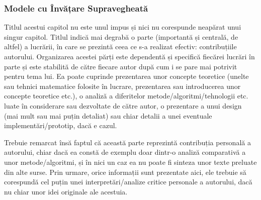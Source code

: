 \subsubsection{Modele cu Învățare Supravegheată}













Titlul acestui capitol nu este unul impus și nici nu corespunde neapărat unui singur capitol. Titlul indică mai degrabă o parte (importantă și centrală, de altfel) a lucrării, în care se prezintă ceea ce s-a realizat efectiv: contribuțiile autorului. Organizarea acestei părți este dependentă și specifică fiecărei lucrări în parte și este stabilită de către fiecare autor după cum i se pare mai potrivit pentru tema lui. Ea poate cuprinde prezentarea unor concepte teoretice (unelte sau tehnici matematice folosite în lucrare, prezentarea sau introducerea unor concepte teoretice etc.), o analiză a diferitelor metode/algoritmi/tehnologii etc. luate în considerare sau dezvoltate de către autor, o prezentare a unui design (mai mult sau mai puțin detaliat) sau chiar detalii a unei eventuale implementări/prototip, dacă e cazul.

Trebuie remarcat însă faptul că această parte reprezintă contribuția personală a autorului, chiar dacă ea constă de exemplu doar dintr-o analiză comparativă a unor metode/algoritmi, și în nici un caz ea nu poate fi sinteza unor texte preluate din alte surse. Prin urmare, orice informații sunt prezentate aici, ele trebuie să corespundă cel puțin unei interpretări/analize critice personale a autorului, dacă nu chiar unor idei originale ale acestuia. 

